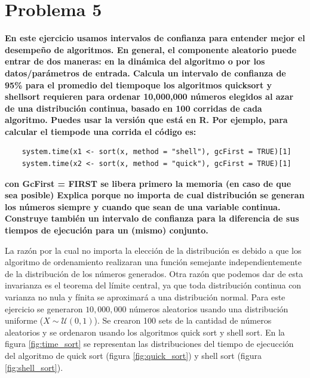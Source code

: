 \section*{Problema 5}

\textbf{En este ejercicio usamos intervalos de confianza para entender mejor el desempeño de algoritmos. En general, el componente aleatorio puede entrar de dos maneras: en la dinámica del algoritmo o por los datos/parámetros de entrada. Calcula un intervalo de confianza de 95\% para el promedio del tiempoque los algoritmos quicksort y shellsort requieren para ordenar 10,000,000 números elegidos al azar de una distribución continua, basado en 100 corridas de cada algoritmo. Puedes usar la versión que está en R. Por ejemplo, para calcular el tiempode una corrida el código es:}

\begin{verbatim}
    system.time(x1 <- sort(x, method = "shell"), gcFirst = TRUE)[1]
    system.time(x2 <- sort(x, method = "quick"), gcFirst = TRUE)[1]
\end{verbatim}

\textbf{con GcFirst = FIRST se libera primero la memoria (en caso de que sea
    posible) Explica porque no importa de cual distribución se generan los números siempre y cuando que sean de una variable continua. Construye también un intervalo de confianza para la diferencia de sus tiempos de ejecución para un (mismo) conjunto.}

La razón por la cual no importa la elección de la distribución es debido a que los algoritmo de ordenamiento realizaran una función semejante independientemente de la distribución de los números generados. Otra razón que podemos dar de esta invarianza es el teorema del límite central, ya que toda distribución continua con varianza no nula y fínita se aproximará a una distribución normal. Para este ejercicio se generaron $10,000,000$ números aleatorios usando una distribución uniforme ($X \sim \mathcal{U}(0,1)$). Se crearon 100 sets de la cantidad de números aleatorios y se ordenaron usando los algoritmos quick sort y shell sort. En la figura \ref{fig:time_sort} se representan las distribuciones del tiempo de ejecucción del algoritmo de quick sort (figura \ref{fig:quick_sort}) y shell sort (figura \ref{fig:shell_sort}).

